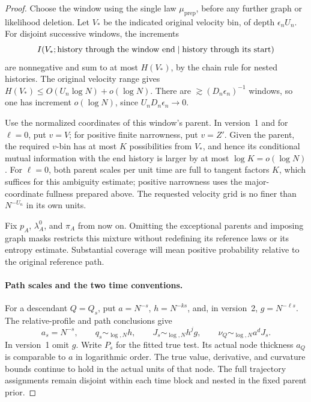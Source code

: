 \begin{proof}
Choose the window using the single law \(\mu_{\mathrm{prep}}\),
before any further graph or likelihood deletion.  Let \(V_*\) be
the indicated original velocity bin, of depth \(\epsilon_n U_n\).
For disjoint successive windows, the increments
\[
 I(V_*;\hbox{history through the window end}
           \mid\hbox{history through its start})
\]
are nonnegative and sum to at most \(H(V_*)\), by the chain rule
for nested histories.  The original velocity range gives
\(H(V_*)\le O(U_n\log N)+o(\log N)\).  There are
\(\gtrsim(D_n\epsilon_n)^{-1}\) windows, so one has increment
\(o(\log N)\), since \(U_nD_n\epsilon_n\to0\).

Use the normalized coordinates of this window's parent.  In version~1
and for \(\ell=0\), put \(v=V\); for positive finite narrowness,
put \(v=Z'\).  Given the parent, the required \(v\)-bin has at most
\(K\) possibilities from \(V_*\), and hence its conditional mutual
information with the end history is larger by at most
\(\log K=o(\log N)\).  For \(\ell=0\), both parent scales per
unit time are full to tangent factors \(K\), which suffices for this
ambiguity estimate; positive narrowness uses the major-coordinate
fullness prepared above.  The requested velocity grid is no finer
than \(N^{-U_n}\) in its own units.

Fix \(p_A\), \(\lambda_A^0\), and \(\pi_A\) from now on.  Omitting
the exceptional parents and imposing graph masks restricts this
mixture without redefining its reference laws or its entropy estimate.
Substantial coverage will mean positive probability relative to the
original reference path.

\paragraph{Path scales and the two time conventions.}
For a descendant \(Q=Q_s\), put
\(a=N^{-s}\), \(h=N^{-ks}\), and, in version~2,
\(g=N^{-\ell s}\).  The relative-profile and path conclusions give
\begin{equation}
 a_s=N^{-s},\qquad q_s\sim_{\log,N}h,
 \qquad J_s\sim_{\log,N}h^jg,
 \qquad \nu_Q\sim_{\log,N}a^dJ_s.
 \label{a03:tangent-scales}
\end{equation}
In version~1 omit \(g\).  Write \(P_s\) for the fitted true test.
Its actual node thickness \(a_Q\) is comparable to \(a\) in
logarithmic order.  The true value,
derivative, and curvature bounds continue to hold in the actual
units of that node.  The full trajectory assignments remain disjoint
within each time block and nested in the fixed parent prior.


\end{proof}
